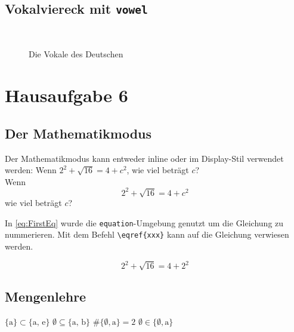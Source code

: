 \documentclass[10pt,paper=a4,abstracton]{scrartcl}
\begin{document}
\subsection{Vokalviereck mit \texttt{vowel}}
~
\begin{figure}[h!]
\centering
{\LARGE
\begin{vowel}
\end{vowel}
}
\caption{Die Vokale des Deutschen}
\end{figure}


\clearpage


\section{Hausaufgabe 6}


\subsection{Der Mathematikmodus}
Der Mathematikmodus kann entweder inline oder im Display-Stil verwendet werden:
Wenn $2^2+\sqrt{16}=4+c^2$, wie viel beträgt $c$? \\
Wenn \[2^2+\sqrt{16}=4+c^2\] wie viel beträgt $c$?

In \eqref{eq:FirstEq} wurde die \texttt{equation}-Umgebung genutzt um die Gleichung zu nummerieren. Mit dem Befehl \texttt{\textbackslash{}eqref\{xxx\}} kann auf die Gleichung verwiesen werden.

\begin{equation}
\label{eq:FirstEq}
2^2+\sqrt{16}=4+2^2
\end{equation}


\subsection{Mengenlehre}

\eal
\ex $\{\textrm{a}\} \subset \{\textrm{a, e}\}$
\ex $\emptyset \subseteq \{\textrm{a, b}\}$
\ex $\# \{\emptyset, \textrm{a} \} = 2$
\ex $\emptyset \in \{\emptyset, \textrm{a} \}$
\zl 
\end{document}
